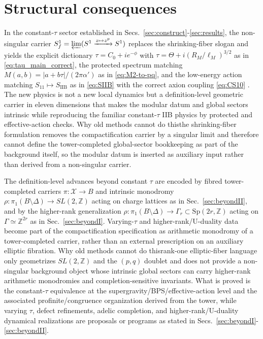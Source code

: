 \documentclass[11pt]{article}
\theoremstyle{remark}
\newcommand{\Z}{\mathbb{Z}}
\begin{document}
\section{Structural consequences}\label{sec:newphysics}
In the constant-\(\tau\) sector established in Secs.~\ref{sec:construct}-\ref{sec:results}, the non-singular carrier \(S_f^{1}=\varprojlim(S^{1}\xrightarrow{z\mapsto z^{p}}S^{1})\) replaces the shrinking-fiber slogan and yields the explicit dictionary \(\tau=C_{0}+ie^{-\phi}\) with \(\tau=\Theta+i(R_{M}/\ell_{M})^{3/2}\) as in \eqref{eq:tau_main_correct}, the protected spectrum matching \(M(a,b)=|a+b\tau|/(2\pi\alpha')\) as in \eqref{eq:M2-to-pq}, and the low-energy action matching \(S_{11}\mapsto S_{\mathrm{IIB}}\) as in \eqref{eq:SIIB} with the correct axion coupling \eqref{eq:CS10} \cite{Schwarz1995, Schwarz1983}. The new physics is not a new local dynamics but a definition-level geometric carrier in eleven dimensions that makes the modular datum and global sectors intrinsic while reproducing the familiar constant-\(\tau\) IIB physics by protected and effective-action checks. Why old methods cannot do this\:the shrinking-fiber formulation removes the compactification carrier by a singular limit and therefore cannot define the tower-completed global-sector bookkeeping as part of the background itself, so the modular datum is inserted as auxiliary input rather than derived from a non-singular carrier.

The definition-level advances beyond constant \(\tau\) are encoded by fibred tower-completed carriers \(\pi:\mathcal{X}\to B\) and intrinsic monodromy \(\rho:\pi_{1}(B\setminus\Delta)\to SL(2,\Z)\) acting on charge lattices as in Sec.~\ref{sec:beyondII}, and by the higher-rank generalization \(\rho:\pi_{1}(B\setminus\Delta)\to \Gamma_{r}\subset \mathrm{Sp}(2r,\Z)\) acting on \(\Gamma\simeq\Z^{2r}\) as in Sec.~\ref{sec:beyondI}. Varying-\(\tau\) and higher-rank/U-duality data become part of the compactification specification as arithmetic monodromy of a tower-completed carrier, rather than an external prescription on an auxiliary elliptic fibration. Why old methods cannot do this\:rank-one elliptic-fiber language only geometrizes \(SL(2,\Z)\) and the \((p,q)\) doublet and does not provide a non-singular background object whose intrinsic global sectors can carry higher-rank arithmetic monodromies and completion-sensitive invariants. What is proved is the constant-\(\tau\) equivalence at the supergravity/BPS/effective-action level and the associated profinite/congruence organization derived from the tower, while varying \(\tau\), defect refinements, adelic completion, and higher-rank/U-duality dynamical realizations are proposals or programs as stated in Secs.~\ref{sec:beyondI}-\ref{sec:beyondII}.
\end{document}
